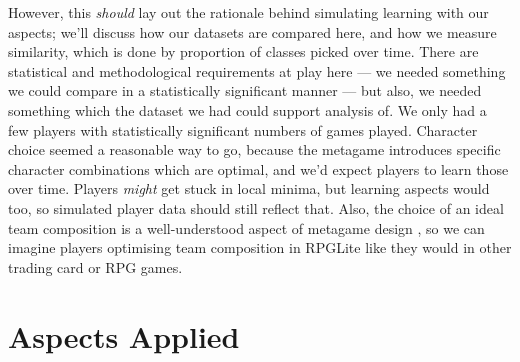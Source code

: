 However, this \emph{should} lay out the rationale behind simulating learning
with our aspects; we'll discuss how our datasets are compared here, and how we
measure similarity, which is done by proportion of classes picked over time.
There are statistical and methodological requirements at play here --- we needed
something we could compare in a statistically significant manner --- but also,
we needed something which the dataset we had could support analysis of. We only
had a few players with statistically significant numbers of games played.
Character choice seemed a reasonable way to go, because the metagame introduces
specific character combinations which are optimal, and we'd expect players to
learn those over time. Players \emph{might} get stuck in local minima, but
learning aspects would too, so simulated player data should still reflect that.
Also, the choice of an ideal team composition is a well-understood aspect of
metagame design , so we can
imagine players optimising team composition in RPGLite like they would in other
trading card or RPG games.


\section{Aspects Applied}\label{sec:optimisation_with_aspects_aspectsdeveloped}






